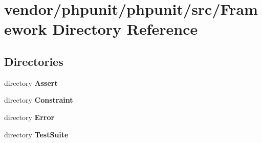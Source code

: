 \section{vendor/phpunit/phpunit/src/\+Framework Directory Reference}
\label{dir_e5f7284dec7a64fcbae764ddae8f27d4}
\subsection*{Directories}
\begin{DoxyCompactItemize}
\item 
directory {\bf Assert}
\item 
directory {\bf Constraint}
\item 
directory {\bf Error}
\item 
directory {\bf Test\+Suite}
\end{DoxyCompactItemize}
